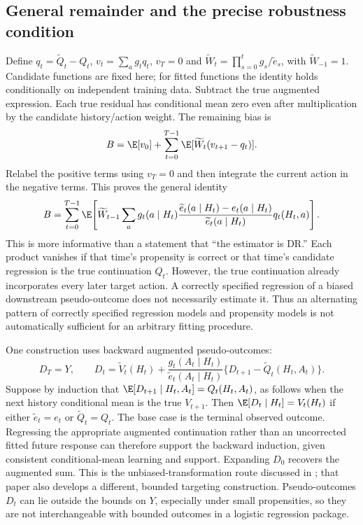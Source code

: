 \subsection{General remainder and the precise robustness condition}
\label{r3:long-remainder-proof}
Define $q_t=\widetilde Q_t-Q_t$, $v_t=\sum_a g_tq_t$,
$v_T=0$ and $\widetilde W_t=\prod_{s=0}^tg_s/\widetilde e_s$,
with $\widetilde W_{-1}=1$. Candidate functions are fixed here;
for fitted functions the identity holds conditionally on independent
training data. Subtract the true augmented expression. Each true
residual has conditional mean zero even after multiplication by the
candidate history/action weight. The remaining bias is
\[
 B=\E[v_0]+\sum_{t=0}^{T-1}
       \E[\widetilde W_t(v_{t+1}-q_t)].
\]
Relabel the positive terms using $v_T=0$ and then integrate the current
action in the negative terms. This proves the general identity
\begin{equation}
 B=\sum_{t=0}^{T-1}\E\!\left[
 \widetilde W_{t-1}\sum_a g_t(a\mid H_t)
 \frac{\widetilde e_t(a\mid H_t)-e_t(a\mid H_t)}
      {\widetilde e_t(a\mid H_t)}q_t(H_t,a)\right].
 \label{r3:long-remainder}
\end{equation}
This is more informative than a statement that ``the estimator is DR.''
Each product vanishes if that time's propensity is correct or that
time's candidate regression is the true continuation $Q_t$. However,
the true continuation already incorporates every later target action.
A correctly specified regression of a biased downstream pseudo-outcome
does not necessarily estimate it. Thus an alternating pattern of
correctly specified regression models and propensity models is not
automatically sufficient for an arbitrary fitting procedure.

One construction uses backward augmented pseudo-outcomes:
\begin{equation}
 D_T=Y,\qquad
 D_t=\widetilde V_t(H_t)+
       \frac{g_t(A_t\mid H_t)}{\widetilde e_t(A_t\mid H_t)}
       \{D_{t+1}-\widetilde Q_t(H_t,A_t)\}.
 \label{r3:sdr-recursion}
\end{equation}
Suppose by induction that
$\E[D_{t+1}\mid H_t,A_t]=Q_t(H_t,A_t)$, as follows when the
next history conditional mean is the true $V_{t+1}$.
Then $\E[D_t\mid H_t]=V_t(H_t)$ if either
$\widetilde e_t=e_t$ or $\widetilde Q_t=Q_t$.
The base case is the terminal observed outcome. Regressing the
appropriate augmented continuation rather than an uncorrected fitted
future response can therefore support the backward induction, given
consistent conditional-mean learning and support. Expanding $D_0$
recovers the augmented sum. This is the unbiased-transformation route
discussed in \citet[Definitions 1--3 and Section 3]{sequentialdr2018};
that paper also develops a different, bounded targeting construction.
Pseudo-outcomes $D_t$ can lie outside the bounds on $Y$, especially
under small propensities, so they are not interchangeable with bounded
outcomes in a logistic regression package.

